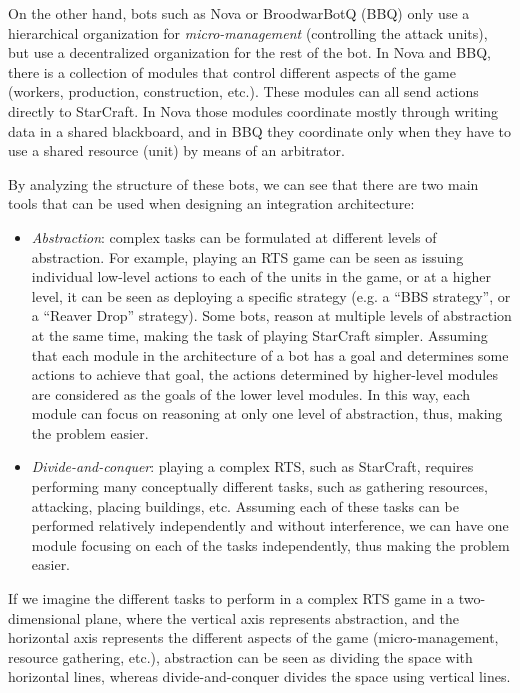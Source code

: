 \documentclass[journal]{IEEEtran}
\begin{document}
On the other hand, bots such as Nova or BroodwarBotQ (BBQ) only use a hierarchical organization for {\em micro-management} (controlling the attack units), but use a decentralized organization for the rest of the bot. In Nova and BBQ, there is a collection of modules that control different aspects of the game (workers, production, construction, etc.). These modules can all send actions directly to StarCraft. In Nova those modules coordinate mostly through writing data in a shared blackboard, and in BBQ they coordinate only when they have to use a shared resource (unit) by means of an arbitrator.

By analyzing the structure of these bots, we can see that there are two main tools that can be used when designing an integration architecture:

\begin{itemize}
\item {\em Abstraction}: complex tasks can be formulated at different levels of abstraction. For example, playing an RTS game can be seen as issuing individual low-level actions to each of the units in the game, or at a higher level, it can be seen as deploying a specific strategy (e.g. a ``BBS strategy'', or a ``Reaver Drop'' strategy). Some bots, reason at multiple levels of abstraction at the same time, making the task of playing StarCraft simpler. Assuming that each module in the architecture of a bot has a goal and determines some actions to achieve that goal, the actions determined by higher-level modules are considered as the goals of the lower level modules. In this way, each module can focus on reasoning at only one level of abstraction, thus, making the problem easier.

\item {\em Divide-and-conquer}: playing a complex RTS, such as StarCraft, requires performing many conceptually different tasks, such as gathering resources, attacking, placing buildings, etc. Assuming each of these tasks can be performed relatively independently and without interference, we can have one module focusing on each of the tasks independently, thus making the problem easier. 
\end{itemize}

If we imagine the different tasks to perform in a complex RTS game in a two-dimensional plane, where the vertical axis represents abstraction, and the horizontal axis represents the different aspects of the game (micro-management, resource gathering, etc.), abstraction can be seen as dividing the space with horizontal lines, whereas divide-and-conquer divides the space using vertical lines.
\end{document}
